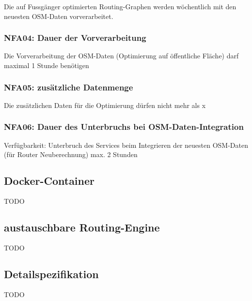 Die auf Fussgänger optimierten Routing-Graphen werden wöchentlich mit den neuesten \ac{OSM}-Daten vorverarbeitet.

\subsubsection{NFA04: Dauer der Vorverarbeitung}
\label{NFA:NFA04}

Die Vorverarbeitung der \ac{OSM}-Daten (Optimierung auf öffentliche Fläche) darf maximal 1 Stunde benötigen

\subsubsection{NFA05: zusätzliche Datenmenge}
\label{NFA:NFA05}

Die zusätzlichen Daten für die Optimierung dürfen nicht mehr als x%

\subsubsection{NFA06: Dauer des Unterbruchs bei OSM-Daten-Integration}
\label{NFA:NFA06}

Verfügbarkeit: Unterbruch des Services beim Integrieren der neuesten \ac{OSM}-Daten (für Router Neuberechnung) max. 2 Stunden

\subsection{Docker-Container}
\label{nfa:Docker-Container}

TODO

\subsection{austauschbare Routing-Engine}
\label{nfa:austauschbare Routing-Engine}

TODO

\subsection{Detailspezifikation}
\label{sub:Detailspezifikation}

TODO